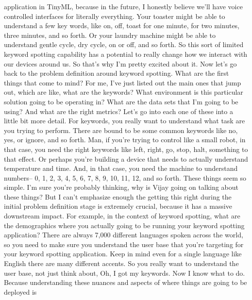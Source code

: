     application in TinyML, because in the future,
    I honestly believe we'll have voice controlled interfaces for literally
    everything.
    Your toaster might be able to understand a few key words,
    like on, off, toast for one minute, for two minutes, three minutes,
    and so forth.
    Or your laundry machine might be able to understand gentle cycle, dry cycle, on
    or off, and so forth.
    So this sort of limited keyword spotting capability
    has a potential to really change how we interact with our devices around us.
    So that's why I'm pretty excited about it.
    Now let's go back to the problem definition around keyword spotting.
    What are the first things that come to mind?
    For me, I've just listed out the main ones that jump out, which are like,
    what are the keywords?
    What environment is this particular solution going to be operating in?
    What are the data sets that I'm going to be using?
    And what are the right metrics?
    Let's go into each one of these into a little bit more detail.
    For keywords, you really want to understand
    what task are you trying to perform.
    There are bound to be some common keywords like no, yes, or ignore,
    and so forth.
    Man, if you're trying to control like a small robot, in that case,
    you need the right keywords like left, right, go, stop, halt, something
    to that effect.
    Or perhaps you're building a device that needs to actually understand
    temperature and time.
    And, in that case, you need the machine to understand numbers--
    0, 1, 2, 3, 4, 5, 6, 7, 8, 9, 10, 11, 12, and so forth.
    These things seem so simple.
    I'm sure you're probably thinking, why is Vijay
    going on talking about these things?
    But I can't emphasize enough the getting this right during the initial problem
    definition stage is extremely crucial, because it
    has a massive downstream impact.
    For example, in the context of keyword spotting,
    what are the demographics where you actually going
    to be running your keyword spotting application?
    There are always 7,000 different languages spoken across the world,
    so you need to make sure you understand the user base
    that you're targeting for your keyword spotting application.
    Keep in mind even for a single language like English
    there are many different accents.
    So you really want to understand the user base,
    not just think about, Oh, I got my keywords.
    Now I know what to do.
    Because understanding these nuances and aspects
    of where things are going to be deployed is
